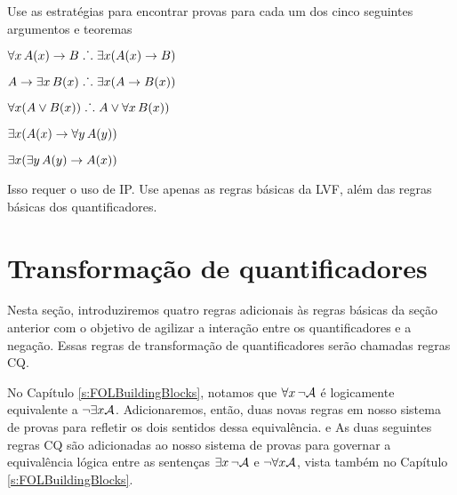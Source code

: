 \problempart
Use as estratégias para encontrar provas para cada um dos cinco seguintes argumentos e teoremas
\begin{earg}
\item $\forall x\,\mathord{A}(x) \rightarrow B \mathrel{\ldotp\dot{}\,\ldotp} \exists x(\mathord{A}(x) \rightarrow B)$
\item $A \rightarrow \exists x\, \mathord{B}(x) \mathrel{\ldotp\dot{}\,\ldotp} \exists x(A \rightarrow \mathord{B}(x))$
\item $\forall x(A \vee \mathord{B}(x)) \mathrel{\ldotp\dot{}\,\ldotp} A \vee \forall x\,\mathord{B}(x))$
\item $\exists x(\mathord{A}(x) \rightarrow \forall y\,\mathord{A}(y))$
\item $\exists x(\exists y\,\mathord{A}(y) \rightarrow \mathord{A}(x))$
\end{earg}
Isso requer o uso de IP. Use apenas as regras básicas da LVF, além das regras básicas dos quantificadores.


\chapter{Transformação de quantificadores}\label{s:CQ}

Nesta seção, introduziremos quatro regras adicionais às regras básicas da seção anterior com o objetivo de agilizar a interação entre os quantificadores e a negação. Essas regras de transformação de quantificadores serão chamadas regras CQ.
 
No Capítulo  \ref{s:FOLBuildingBlocks}, notamos que $\forall x\, \neg\mathcal{A}$
   é logicamente equivalente a  $\neg\exists x\mathcal{A}$. Adicionaremos, então, duas novas regras em nosso sistema de provas para refletir os dois sentidos dessa equivalência.
e
As duas seguintes  regras CQ  são adicionadas ao nosso sistema de provas para governar a equivalência lógica entre as sentenças $\exists x\, \neg\mathcal{A}$  e   $\neg\forall x\mathcal{A}$, vista também no  Capítulo  \ref{s:FOLBuildingBlocks}.

